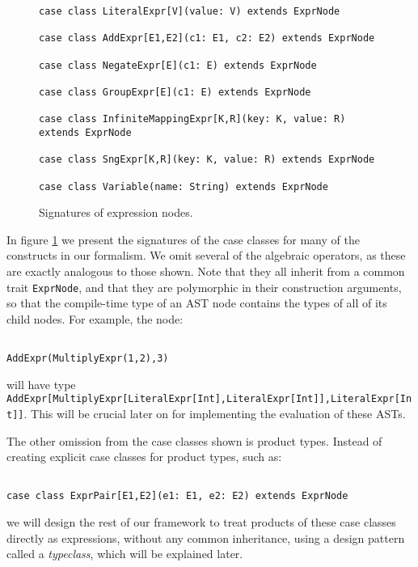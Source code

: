 \begin{figure}
\begin{lstlisting}
case class LiteralExpr[V](value: V) extends ExprNode

case class AddExpr[E1,E2](c1: E1, c2: E2) extends ExprNode

case class NegateExpr[E](c1: E) extends ExprNode

case class GroupExpr[E](c1: E) extends ExprNode

case class InfiniteMappingExpr[K,R](key: K, value: R) extends ExprNode

case class SngExpr[K,R](key: K, value: R) extends ExprNode

case class Variable(name: String) extends ExprNode

\end{lstlisting}
\caption{Signatures of expression nodes.}
\label{exprnodes}
\end{figure}

In figure \ref{exprnodes} we present the signatures of the case classes for many of the constructs in our formalism. We omit several of the algebraic operators, as these are exactly analogous to those shown. Note that they all inherit from a common trait \lstinline{ExprNode}, and that they are polymorphic in their construction arguments, so that the compile-time type of an AST node contains the types of all of its child nodes. For example, the node:

\begin{lstlisting}

AddExpr(MultiplyExpr(1,2),3)
\end{lstlisting} 

will have type \lstinline{AddExpr[MultiplyExpr[LiteralExpr[Int],LiteralExpr[Int]],LiteralExpr[Int]]}.
This will be crucial later on for implementing the evaluation of these ASTs.

The other omission from the case classes shown is product types. Instead of creating explicit case classes for product types, such as:

\begin{lstlisting}

case class ExprPair[E1,E2](e1: E1, e2: E2) extends ExprNode
\end{lstlisting} \vspace{1em}

we will design the rest of our framework to treat products of these case classes directly as expressions, without any common inheritance, using a design pattern called a \textit{typeclass}, which will be explained later.

